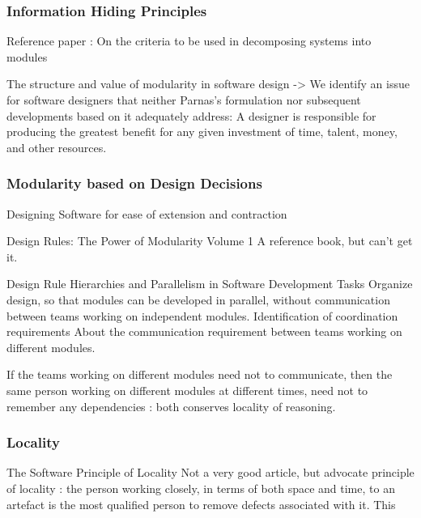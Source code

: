 \subsubsection{Information Hiding Principles}

Reference paper :
On the criteria to be used in decomposing systems into modules \cite{Parnas1972}


The structure and value of modularity in software design \cite{Sullivan2001a}
-> We identify an issue for software designers that neither Parnas’s formulation nor subsequent developments based on it adequately address: A designer is responsible for producing the greatest benefit for any given investment of time, talent, money, and other resources.


\subsubsection{Modularity based on Design Decisions}

Designing Software for ease of extension and contraction \cite{Parnas1979}

Design Rules: The Power of Modularity Volume 1 \cite{Baldwin1999}
A reference book, but can't get it.

Design Rule Hierarchies and Parallelism in Software Development Tasks \cite{Wong2009}
Organize design, so that modules can be developed in parallel, without communication between teams working on independent modules.
Identification of coordination requirements \cite{Cataldo2006}
About the communication requirement between teams working on different modules.

If the teams working on different modules need not to communicate, then the same person working on different modules at different times, need not to remember any dependencies : both conserves locality of reasoning.


\subsubsection{Locality}

The Software Principle of Locality \cite{Dobson}
Not a very good article, but advocate principle of locality :
the person working closely, in terms of both space and time, to an artefact is the most qualified person to remove defects associated with it. This
















